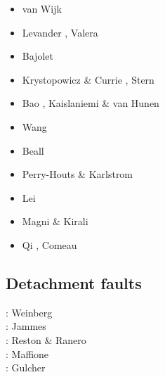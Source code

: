 \begin{scriptsize}
\begin{itemize}
\item[\twothousandten] van Wijk \etal \cite{vabv10}
\item[\twothousandeleven] Levander \etal \cite{lesm11}, Valera \etal \cite{vanj11}
\item[\twothousandtwelve] Bajolet \etal \cite{bagf12}
\item[\twothousandthirteen] Krystopowicz \& Currie \cite{krcu13}, Stern \etal \cite{sths13}
\item[\twothousandfourteen] Bao \etal \cite{baeg14}, Kaislaniemi \& van Hunen \cite{kava14}
\item[\twothousandfifteen] Wang \etal \cite{wahz15}
\item[\twothousandseventeen] Beall \etal \cite{bems17}
\item[\twothousandeighteen] Perry-Houts \& Karlstrom \cite{peka18}
\item[\twothousandnineteen] Lei \etal \cite{lell19}
\item[\twothousandtwenty] Magni \& Kirali \cite{maki20}
\item[\twothousandtwentyone] Qi \etal \cite{qizx21}, Comeau \etal \cite{cosb21}
\end{itemize}
\end{scriptsize}


\subsection{Detachment faults} 

\begin{scriptsize}
\twothousandseven: Weinberg \etal \cite{werr07}\\
\twothousandten: Jammes \etal \cite{jaml10}\\
\twothousandeleven: Reston \& Ranero \cite{rera11}\\
\twothousandfifteen: Maffione \etal \cite{matv15}\\
\twothousandnineteen: Gulcher \etal \cite{gubg19}
\end{scriptsize}

